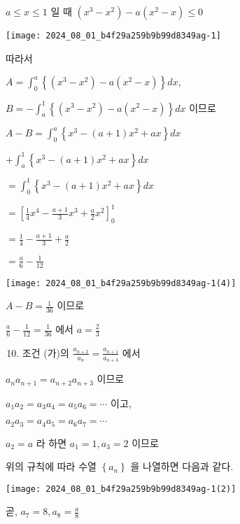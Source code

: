 \documentclass[10pt]{article}
\begin{document}
$a \leq x \leq 1$ 일 때 $\left(x^{3}-x^{2}\right)-a\left(x^{2}-x\right) \leq 0$

\begin{center}
\texttt{[image: 2024\_08\_01\_b4f29a259b9b99d8349ag-1]}
\end{center}

따라서

$A=\int_{0}^{a}\left\{\left(x^{3}-x^{2}\right)-a\left(x^{2}-x\right)\right\} d x$,

$B=-\int_{a}^{1}\left\{\left(x^{3}-x^{2}\right)-a\left(x^{2}-x\right)\right\} d x$ 이므로

$A-B=\int_{0}^{a}\left\{x^{3}-(a+1) x^{2}+a x\right\} d x$

$+\int_{a}^{1}\left\{x^{3}-(a+1) x^{2}+a x\right\} d x$

$=\int_{0}^{1}\left\{x^{3}-(a+1) x^{2}+a x\right\} d x$

$=\left[\frac{1}{4} x^{4}-\frac{a+1}{3} x^{3}+\frac{a}{2} x^{2}\right]_{0}^{1}$

$=\frac{1}{4}-\frac{a+1}{3}+\frac{a}{2}$

$=\frac{a}{6}-\frac{1}{12}$

\begin{center}
\texttt{[image: 2024\_08\_01\_b4f29a259b9b99d8349ag-1(4)]}
\end{center}

$A-B=\frac{1}{36}$ 이므로

$\frac{a}{6}-\frac{1}{12}=\frac{1}{36}$ 에서 $a=\frac{2}{3}$

\begin{enumerate}
  \setcounter{enumi}{9}
  \item 조건 (가)의 $\frac{a_{n+2}}{a_{n}}=\frac{a_{n+1}}{a_{n+3}}$ 에서
\end{enumerate}

$a_{n} a_{n+1}=a_{n+2} a_{n+3}$ 이므로

$a_{1} a_{2}=a_{3} a_{4}=a_{5} a_{6}=\cdots$ 이고,

$a_{2} a_{3}=a_{4} a_{5}=a_{6} a_{7}=\cdots$

$a_{2}=a$ 라 하면 $a_{1}=1, a_{3}=2$ 이므로

위의 규칙에 따라 수열 $\left\{a_{n}\right\}$ 을 나열하면 다음과 같다.

\begin{center}
\texttt{[image: 2024\_08\_01\_b4f29a259b9b99d8349ag-1(2)]}
\end{center}

곧, $a_{7}=8, a_{8}=\frac{a}{8}$
\end{document}
